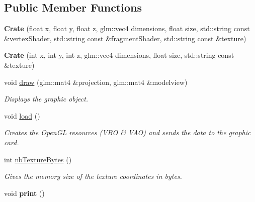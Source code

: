 \subsection*{Public Member Functions}
\begin{DoxyCompactItemize}
\item 
\hypertarget{classCrate_ae8b4fbf45d678c405bfadb1d632ac98d}{}{\bfseries Crate} (float x, float y, float z, glm\+::vec4 dimensions, float size, std\+::string const \&vertex\+Shader, std\+::string const \&fragment\+Shader, std\+::string const \&texture)\label{classCrate_ae8b4fbf45d678c405bfadb1d632ac98d}

\item 
\hypertarget{classCrate_a0ea206abfee83e8114ae8bf3ab5acd59}{}{\bfseries Crate} (int x, int y, int z, glm\+::vec4 dimensions, float size, std\+::string const \&texture)\label{classCrate_a0ea206abfee83e8114ae8bf3ab5acd59}

\item 
void \hyperlink{classCrate_a0ef280ead61384d18817071ef85041d3}{draw} (glm\+::mat4 \&projection, glm\+::mat4 \&modelview)
\begin{DoxyCompactList}\small\item\em Displays the graphic object. \end{DoxyCompactList}\item 
\hypertarget{classCrate_a5a1c16623dae0656d9cc13260d1d227b}{}void \hyperlink{classCrate_a5a1c16623dae0656d9cc13260d1d227b}{load} ()\label{classCrate_a5a1c16623dae0656d9cc13260d1d227b}

\begin{DoxyCompactList}\small\item\em Creates the Open\+G\+L resources (V\+B\+O \& V\+A\+O) and sends the data to the graphic card. \end{DoxyCompactList}\item 
int \hyperlink{classCrate_a29df7675912f47eddd3a32010a8611fd}{nb\+Texture\+Bytes} ()
\begin{DoxyCompactList}\small\item\em Gives the memory size of the texture coordinates in bytes. \end{DoxyCompactList}\item 
\hypertarget{classCrate_aa52ebd20025131701e8b41986f318057}{}void {\bfseries print} ()\label{classCrate_aa52ebd20025131701e8b41986f318057}

\end{DoxyCompactItemize}
